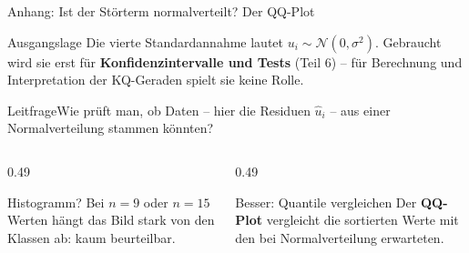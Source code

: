 \documentclass[aspectratio=169,11pt]{beamer}
\newcommand{\leitfrage}[1]{\begin{exampleblock}{Leitfrage}#1\end{exampleblock}}
\begin{document}
\begin{frame}{Anhang: Ist der Störterm normalverteilt? Der QQ-Plot}
  \begin{block}{Ausgangslage}
    Die vierte Standardannahme lautet $u_i \sim \mathcal{N}(0,\sigma^{2})$.
    Gebraucht wird sie erst für \textbf{Konfidenzintervalle und Tests} (Teil 6) --
    für Berechnung und Interpretation der KQ-Geraden spielt sie keine Rolle.
  \end{block}

  \leitfrage{Wie prüft man, ob Daten -- hier die Residuen $\hat{u}_i$ -- aus einer
    Normalverteilung stammen könnten?}

  \begin{columns}[T]
    \begin{column}{0.49\textwidth}
      \begin{alertblock}{Histogramm?}
        Bei $n = 9$ oder $n = 15$ Werten hängt das Bild stark von den Klassen
        ab: kaum beurteilbar.
      \end{alertblock}
    \end{column}
    \begin{column}{0.49\textwidth}
      \begin{exampleblock}{Besser: Quantile vergleichen}
        Der \textbf{QQ-Plot} vergleicht die sortierten Werte mit den bei
        Normalverteilung erwarteten.
      \end{exampleblock}
    \end{column}
  \end{columns}
\end{frame}
\end{document}
